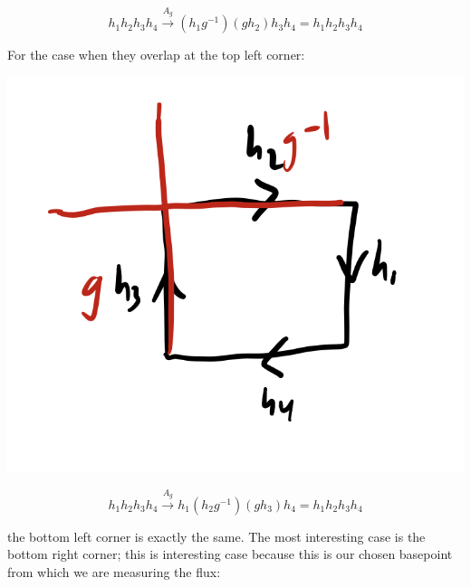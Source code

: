\begin{enumerate}
    \begin{equation}
        h_1h_2h_3h_4 \stackrel{A_g}{\to} (h_1g^{-1})(gh_2)h_3h_4 = h_1h_2h_3h_4
    \end{equation} 

    For the case when they overlap at the top left corner:

    \begin{center}
        \includegraphics[scale=0.35]{Lectures/Images/lec7-overlap2.png}
    \end{center}

    \begin{equation}
        h_1h_2h_3h_4 \stackrel{A_g}{\to} h_1(h_2g^{-1})(gh_3)h_4 = h_1h_2h_3h_4
    \end{equation}

    the bottom left corner is exactly the same. The most interesting case is the bottom right corner; this is interesting case because this is our chosen basepoint from which we are measuring the flux:


\end{enumerate}
